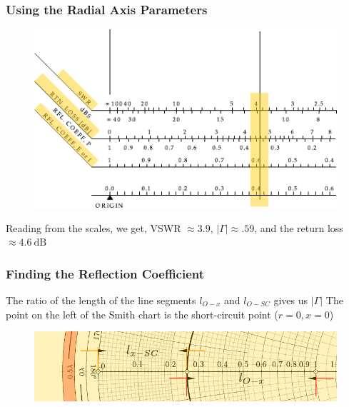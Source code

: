 \documentclass[10pt, compress]{beamer}
\begin{document}
\begin{frame}
    \frametitle{Using the Radial Axis Parameters}
    \begin{figure}[T!]
        \centering
        \includegraphics[width=.9\textwidth]{radial axis.pdf}
    \end{figure}
    \begin{outline}
        \1 Reading from the scales, we get, VSWR $\approx 3.9$, $|\Gamma| \approx .59$, and the return loss $\approx \SI{4.6}{\dB}$
    \end{outline}

\end{frame}
\begin{frame}
    \frametitle{Finding the Reflection Coefficient}
    \begin{outline}
        \1 The ratio of the length of the line segments $l_{O - x}$ and $l_{O - SC}$ gives us $|\Gamma|$
        \1 The point on the left of the Smith chart is the short-circuit point ($r = 0, x = 0$)
    \end{outline}
    \begin{figure}[T!]
        \centering
        \includegraphics[width=.9\textwidth]{smith example Gamma_cropped.pdf}
    \end{figure}

\end{frame}
\end{document}
